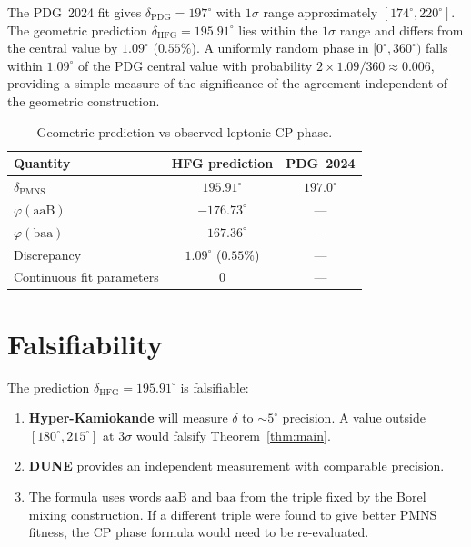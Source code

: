 \documentclass[11pt,a4paper]{article}
\theoremstyle{definition}
\theoremstyle{remark}
\begin{document}
The PDG~2024 fit gives $\delta_{\mathrm{PDG}}=197^\circ$ with
$1\sigma$ range approximately $[174^\circ,220^\circ]$.
The geometric prediction $\delta_{\mathrm{HFG}}=195.91^\circ$
lies within the $1\sigma$ range and differs from the central value
by $1.09^\circ$ ($0.55\%$).
A uniformly random phase in $[0^\circ,360^\circ)$ falls within
$1.09^\circ$ of the PDG central value with probability
$2\times1.09/360 \approx 0.006$, providing a simple measure of
the significance of the agreement independent of the geometric
construction.

\begin{table}[htbp]
\centering
\caption{Geometric prediction vs observed leptonic CP phase.}
\label{tab:comparison}
\begin{tabular}{lcc}
\toprule
Quantity & HFG prediction & PDG~2024 \\
\midrule
$\delta_{\mathrm{PMNS}}$ & $195.91^\circ$ & $197.0^\circ$ \\
$\varphi(\mathrm{aaB})$ & $-176.73^\circ$ & --- \\
$\varphi(\mathrm{baa})$ & $-167.36^\circ$ & --- \\
Discrepancy & $1.09^\circ$ ($0.55\%$) & --- \\
Continuous fit parameters & 0 & --- \\
\bottomrule
\end{tabular}
\end{table}

\section{Falsifiability}
\label{sec:predictions}

The prediction $\delta_{\mathrm{HFG}}=195.91^\circ$ is falsifiable:
\begin{enumerate}[(1)]
\item \textbf{Hyper-Kamiokande} will measure $\delta$ to
  $\sim5^\circ$ precision.
  A value outside $[180^\circ,215^\circ]$ at $3\sigma$ would
  falsify Theorem~\ref{thm:main}.
\item \textbf{DUNE} provides an independent measurement with
  comparable precision.
\item The formula uses words $\mathrm{aaB}$ and $\mathrm{baa}$
  from the triple fixed by the Borel mixing construction.
  If a different triple were found to give better PMNS fitness,
  the CP phase formula would need to be re-evaluated.
\end{enumerate}
\end{document}

